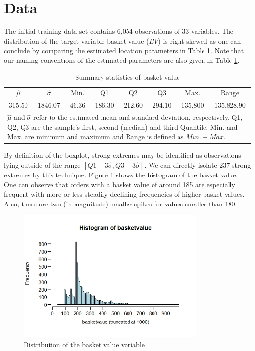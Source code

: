 \documentclass[12pt]{article}
\begin{document}
\section{Data}
\label{sect:data}
The initial training data set contains 6,054 observations of 33 variables. The distribution of the target variable basket value ($BV$) is right-skewed as one can conclude by comparing the estimated location parameters in Table \ref{tab:sumbv}. Note that our naming conventions of the estimated parameters are also given in Table \ref{tab:sumbv}.
\begin{table}[ht]
\centering
\begin{tabular}{cccccccc}
  \hline
  \hline
 $\hat{\mu}$ &  $\hat{\sigma}$ & Min. & Q1 & Q2 & Q3 & Max.  & Range\\ 
315.50 & 1846.07 & 46.36 & 186.30 & 212.60 & 294.10 & 135,800 & 135,828.90\\ 
   \hline
   \hline
\multicolumn{8}{l}{ \parbox{5.2in}{\vspace{1pt} \footnotesize{$\hat{\mu}$ and $\hat{\sigma}$  refer to the estimated mean and standard deviation, respectively. Q1, Q2, Q3 are the sample's first, second (median) and third Quantile. Min. and Max. are minimum and maximum and Range is defined as $Min. - Max.$}}}
\end{tabular}
\vspace{-5pt}
\caption{Summary statistics of basket value}
\label{tab:sumbv}
\end{table}
By definition of the boxplot, strong extremes may be identified as observations lying outside of the range $[Q1 - 3\hat{\sigma} , Q3 + 3\hat{\sigma}]$. We can directly isolate 237 strong extremes by this technique. 
Figure \ref{fig:histbv} shows the histogram of the basket value. One can observe that orders with a basket value of around 185 are especially frequent with more or less steadily declining frequencies of higher basket values. Also, there are two (in magnitude) smaller spikes for values smaller than 180. 
\begin{figure}[H]
\centering
\includegraphics[width=0.83\textwidth]{histbasket.jpeg}
\vspace{-5pt}
\caption{Distribution of the basket value variable}
\label{fig:histbv}
\end{figure}
\end{document}
